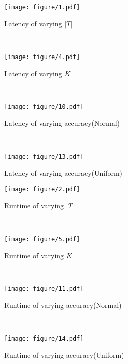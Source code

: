 \begin{figure*}[htb]
	\centering
	\begin{subfigure}[b]{0.22\textwidth}
		\texttt{[image: figure/1.pdf]}
		\caption{\footnotesize{Latency of varying $|T|$}}
		\label{fig:card_t_sum}
	\end{subfigure}
	~~
	\begin{subfigure}[b]{0.22\textwidth}
		\texttt{[image: figure/4.pdf]}
		\caption{\footnotesize{Latency of varying $K$}}
		\label{fig:card_w_sum}
	\end{subfigure}
	~~
	\begin{subfigure}[b]{0.22\textwidth}
		\texttt{[image: figure/10.pdf]}
		\caption{\footnotesize{Latency of varying accuracy(Normal)}}
		\label{fig:card_p_sum}
	\end{subfigure}
	~~
	\begin{subfigure}[b]{0.22\textwidth}
		\texttt{[image: figure/13.pdf]}
		\caption{\footnotesize{Latency of varying accuracy(Uniform)}}
		\label{fig:cf_sum}
	\end{subfigure}
	
	\begin{subfigure}[b]{0.22\textwidth}
		\texttt{[image: figure/2.pdf]}
		\caption{\footnotesize{Runtime of varying $|T|$}}
		\label{fig:card_t_time}
	\end{subfigure}
	~~
	\begin{subfigure}[b]{0.22\textwidth}
		\texttt{[image: figure/5.pdf]}
		\caption{\footnotesize{Runtime of varying $K$}}
		\label{fig:card_w_time}
	\end{subfigure}
	~~
	\begin{subfigure}[b]{0.22\textwidth}
		\texttt{[image: figure/11.pdf]}
		\caption{\footnotesize{Runtime of varying accuracy(Normal)}}
		\label{fig:card_p_time}
	\end{subfigure}
	~~
	\begin{subfigure}[b]{0.22\textwidth}
		\texttt{[image: figure/14.pdf]}
		\caption{\footnotesize{Runtime of varying accuracy(Uniform)}}
		\label{fig:rw_time}
	\end{subfigure}
	

\end{figure*}
